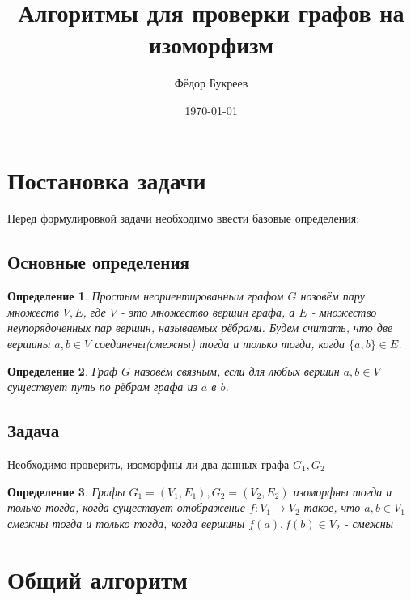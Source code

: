 \documentclass[fleqn]{article}
\title{Алгоритмы для проверки графов на изоморфизм}
\author{Фёдор Букреев}
\date{\today}
\newtheorem{definition}{Определение}
\begin{document}
\maketitle
\tableofcontents

\section{Постановка задачи}
Перед формулировкой задачи необходимо ввести базовые определения:
\subsection{Основные определения}
\begin{definition}
    Простым неориентированным графом $G$ нозовём пару множеств $V, E$, где $V$ - это множество вершин графа, а $E$ - множество неупорядоченных пар вершин, называемых рёбрами. Будем считать, что две вершины $a, b \in V$ соединены(смежны) тогда и только тогда, когда $\{a, b\} \in E$.
\end{definition}
\begin{definition}
    Граф $G$ назовём связным, если для любых вершин $a, b \in V$ существует путь по рёбрам графа из $a$ в $b$.
\end{definition}
\subsection{Задача}
Необходимо проверить, изоморфны ли два данных графа $G_1, G_2$
\begin{definition}
    Графы $G_1=(V_1, E_1), G_2=(V_2, E_2)$ изоморфны тогда и только тогда, когда существует отображение $f: V_1 \rightarrow V_2$ такое, что $a, b \in V_1$ смежны тогда и только тогда, когда вершины $f(a), f(b) \in V_2$ - смежны
\end{definition}



\section{Общий алгоритм}


\end{document}
